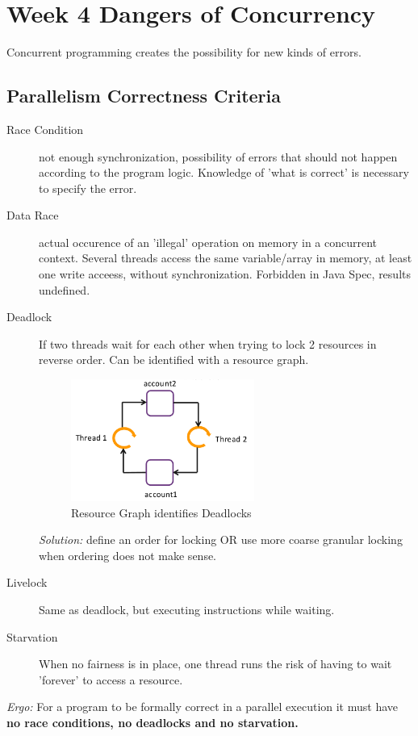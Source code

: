 \section{Week 4 Dangers of Concurrency}

Concurrent programming creates the possibility for new kinds of errors.

\subsection{Parallelism Correctness Criteria}

\begin{description}
  \item[Race Condition] not enough synchronization, possibility of errors that should not happen according to the program logic. Knowledge of 'what is correct' is necessary to specify the error.
  \item[Data Race] actual occurence of an 'illegal' operation on memory in a concurrent context. Several threads access the same variable/array in memory, at least one write acceess, without synchronization. Forbidden in Java Spec, results undefined.
  \item[Deadlock] If two threads wait for each other when trying to lock 2 resources in reverse order. Can be identified with a resource graph. 
  \begin{figure}
    \centering
    \includegraphics[width=6cm]{res/04-resource-graph.png}
    \caption{Resource Graph identifies Deadlocks}
  \end{figure}
  \textit{Solution:} define an order for locking OR use more coarse granular locking when ordering does not make sense.
  \item[Livelock] Same as deadlock, but executing instructions while waiting. 
  \item[Starvation] When no fairness is in place, one thread runs the risk of having to wait 'forever' to access a resource.
\end{description}

\noindent
\textit{Ergo:} For a program to be formally correct in a parallel execution it must have \textbf{no race conditions, no deadlocks and no starvation.}

